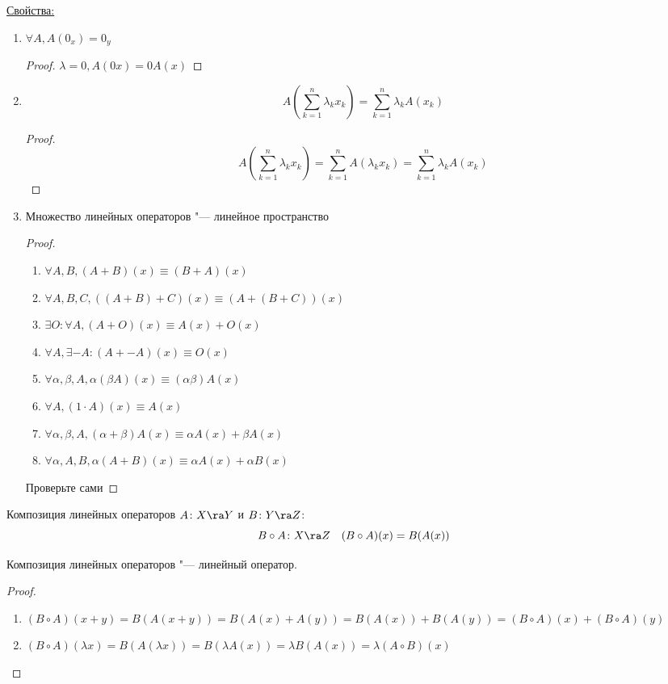 \underline{Свойства:}
\begin{enumerate}
\item
	$\forall A, A(0_x) = 0_y$
	\begin{proof}
		$\lambda = 0, A(0x) = 0A(x)$
	\end{proof}

\item
	\[ A\left(\sum_{k = 1}^n \lambda_k x_k\right) = \sum_{k = 1}^n \lambda_k A\left(x_k\right) \]
	\begin{proof}
		\[ A\left(\sum_{k = 1}^n \lambda_k x_k\right) = \sum_{k = 1}^n A\left(\lambda_k x_k\right) = \sum_{k = 1}^n \lambda_k A\left(x_k\right) \]
	\end{proof}

\item
	Множество линейных операторов "--- линейное пространство
	\begin{proof}
		\begin{enumerate}
			\item $\forall A, B, (A + B)(x) \equiv (B + A)(x)$
			\item $\forall A, B, C, ((A + B) + C)(x) \equiv (A + (B + C))(x)$
			\item $\exists O \colon \forall A, (A + O)(x) \equiv A(x) + O(x)$
			\item $\forall A, \exists -A \colon (A + -A)(x) \equiv O(x)$
			\item $\forall \alpha, \beta, A, \alpha(\beta A)(x) \equiv (\alpha \beta)A(x)$
			\item $\forall A, (1 \cdot A)(x) \equiv A(x)$
			\item $\forall \alpha, \beta, A, (\alpha + \beta)A(x) \equiv \alpha A(x) + \beta A(x)$
			\item $\forall \alpha, A, B, \alpha(A + B)(x) \equiv \alpha A(x) + \alpha B(x)$
		\end{enumerate}
	Проверьте сами
\end{proof}
\end{enumerate}

\begin{Def}
	Композиция линейных операторов $A \colon X \ra Y$ и $B \colon Y \ra Z$:
	\[ B \circ A \colon X \ra Z \quad (B \circ A)(x) = B(A(x)) \]
\end{Def}
\begin{theorem}
	Композиция линейных операторов "--- линейный оператор.
\end{theorem}
\begin{proof}
	\begin{enumerate}
		\item $(B \circ A)(x + y)  = B(A(x + y)) = B(A(x) + A(y)) = B(A(x)) + B(A(y))  = (B \circ A)(x) + (B \circ A)(y)$
		\item $(B \circ A)(\lambda x) = B(A(\lambda x)) = B(\lambda A(x)) = \lambda B(A(x)) = \lambda (A \circ B) (x)$
	\end{enumerate}
\end{proof}

